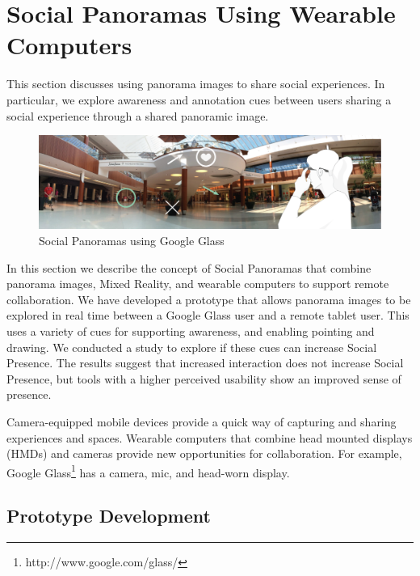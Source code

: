 \section{Social Panoramas Using Wearable Computers}
\label{sec:pano}

This section discusses using panorama images to share social experiences. In particular, we explore awareness and annotation cues between users sharing a social experience through a shared panoramic image.

\begin{figure}[ht]
	\centering
	\includegraphics[width=\linewidth]{images/ismar14/concept}
	\caption{Social Panoramas using Google Glass}
	\label{fig:ismar14:concept}
\end{figure}

In this section we describe the concept of Social Panoramas \cite{Reichherzer2014, Billinghurst2014} that combine panorama images, Mixed Reality, and wearable computers to support remote collaboration. We have developed a prototype that allows panorama images to be explored in real time between a Google Glass user and a remote tablet user. This uses a variety of cues for supporting awareness, and enabling pointing and drawing. We conducted a study to explore if these cues can increase Social Presence. The results suggest that increased interaction does not increase Social Presence, but tools with a higher perceived usability show an improved sense of presence.

Camera-equipped mobile devices provide a quick way of capturing and sharing experiences and spaces. Wearable computers that combine head mounted displays (HMDs) and cameras provide new opportunities for collaboration. For example, Google Glass\footnote{http://www.google.com/glass/} has a camera, mic, and head-worn display.


\subsection{Prototype Development}

